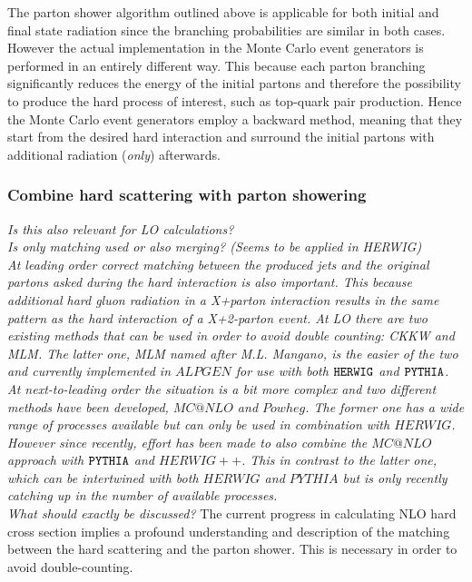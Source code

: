 The parton shower algorithm outlined above is applicable for both initial and final state radiation since the branching probabilities are similar in both cases. However the actual implementation in the Monte Carlo event generators is performed in an entirely different way. This because each parton branching significantly reduces the energy of the initial partons and therefore the possibility to produce the hard process of interest, such as top-quark pair production. 
Hence the Monte Carlo event generators employ a backward method, meaning that they start from the desired hard interaction and surround the initial partons with additional radiation (\textit{only}) afterwards.

\subsubsection{Combine hard scattering with parton showering}
\textit{Is this also relevant for LO calculations?}\\
\textit{Is only matching used or also merging? (Seems to be applied in HERWIG)}\\

\textit{At leading order correct matching between the produced jets and the original partons asked during the hard interaction is also important. This because additional hard gluon radiation in a X+parton interaction results in the same pattern as the hard interaction of a X+2-parton event. At LO there are two existing methods that can be used in order to avoid double counting: CKKW and MLM. The latter one, MLM named after M.L. Mangano, is the easier of the two and currently implemented in $ALPGEN$ for use with both $\texttt{HERWIG}$ and $\texttt{PYTHIA}$.\\
At next-to-leading order the situation is a bit more complex and two different methods have been developed, $MC@NLO$ and $Powheg$. The former one has a wide range of processes available but can only be used in combination with $HERWIG$. However since recently, effort has been made to also combine the $MC@NLO$ approach with $\texttt{PYTHIA}$ and $HERWIG++$. This in contrast to the latter one, which can be intertwined with both $HERWIG$ and $PYTHIA$ but is only recently catching up in the number of available processes.}\\

\textit{What should exactly be discussed?}
The current progress in calculating NLO hard cross section implies a profound understanding and description of the matching between the hard scattering and the parton shower. This is necessary in order to avoid double-counting.

